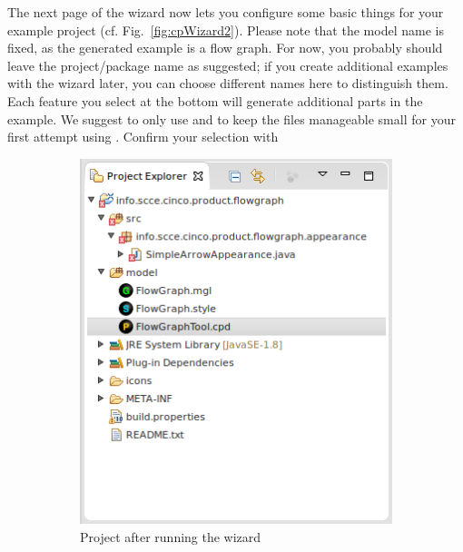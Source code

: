 \documentclass[a4paper,american,12pt]{scrreprt}
\begin{document}
The next page of the wizard now lets you configure some basic things for your
example project (cf. Fig.~\ref{fig:cpWizard2}). Please note that the model name
is fixed, as the generated example is a flow graph. For now, you probably should leave
the project/package name as suggested; if you create additional examples with
the wizard later, you can choose different names here to distinguish them. Each
feature you select at the bottom will generate additional parts in the example.
We suggest to only use  and  to keep the files
manageable small for your first attempt using \cinco{}. Confirm your
selection with 

\begin{figure}
	\centering
	\begin{subfigure}[t]{0.40\textwidth}
		\includegraphics[width=\textwidth]{screenshots/example-cp-pregen.png}
		\caption{Project after running the wizard}
		\label{fig:cpPreGen}
	\end{subfigure}
	\qquad
	\begin{subfigure}[t]{0.40\textwidth}

\end{subfigure}
\end{figure}
\end{document}
